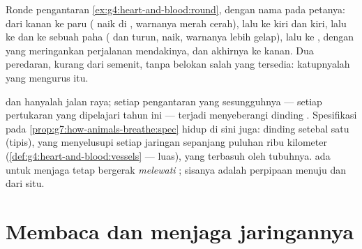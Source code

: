 \begin{example}\label{ex:g7:heart-and-circulation:tour}
Ronde pengantaran \cref{ex:g4:heart-and-blood:round}, dengan nama pada
petanya: dari  kanan ke  paru ( naik di
, warnanya merah cerah), lalu ke  kiri dan 
kiri, lalu ke  dan ke  sebuah  paha ( dan
 turun,  naik, warnanya lebih gelap), lalu ke
, dengan  yang meringankan perjalanan mendakinya, dan
akhirnya ke  kanan. Dua peredaran, kurang dari semenit,
tanpa belokan salah yang tersedia: katupnyalah yang mengurus itu.
\end{example}

\begin{remark}\label{rem:g7:heart-and-circulation:capillaries}
 dan  hanyalah jalan raya; setiap pengantaran yang
sesungguhnya --- setiap pertukaran yang dipelajari tahun ini ---
terjadi menyeberangi dinding . Spesifikasi pada
\cref{prop:g7:how-animals-breathe:spec} hidup di sini juga: dinding
setebal satu  (tipis), yang menyelusupi setiap jaringan sepanjang
puluhan ribu kilometer
(\cref{def:g4:heart-and-blood:vessels} --- luas), yang terbasuh oleh
 tubuhnya.  ada untuk menjaga  tetap bergerak
\emph{melewati }; sisanya adalah perpipaan menuju dan dari
situ.
\end{remark}

\section{Membaca dan menjaga jaringannya}

